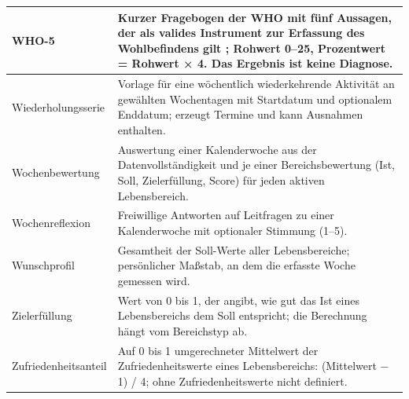 \begin{longtable}{@{}L{3.4cm}L{11.8cm}@{}}
  \midrule
  WHO-5 & Kurzer Fragebogen der \acs{WHO} mit fünf Aussagen, der als valides Instrument zur Erfassung des Wohlbefindens gilt \parencite[S.~167]{topp2015}; Rohwert 0--25, Prozentwert = Rohwert × 4. Das Ergebnis ist keine Diagnose. \\
  \midrule
  Wiederholungsserie & Vorlage für eine wöchentlich wiederkehrende Aktivität an gewählten Wochentagen mit Startdatum und optionalem Enddatum; erzeugt Termine und kann Ausnahmen enthalten. \\
  \midrule
  Wochenbewertung & Auswertung einer Kalenderwoche aus der Datenvollständigkeit und je einer Bereichsbewertung (Ist, Soll, Zielerfüllung, Score) für jeden aktiven Lebensbereich. \\
  \midrule
  Wochenreflexion & Freiwillige Antworten auf Leitfragen zu einer Kalenderwoche mit optionaler Stimmung (1--5). \\
  \midrule
  Wunschprofil & Gesamtheit der Soll-Werte aller Lebensbereiche; persönlicher Maßstab, an dem die erfasste Woche gemessen wird. \\
  \midrule
  Zielerfüllung & Wert von 0 bis 1, der angibt, wie gut das Ist eines Lebensbereichs dem Soll entspricht; die Berechnung hängt vom Bereichstyp ab. \\
  \midrule
  Zufriedenheitsanteil & Auf 0 bis 1 umgerechneter Mittelwert der Zufriedenheitswerte eines Lebensbereichs: (Mittelwert − 1) / 4; ohne Zufriedenheitswerte nicht definiert. \\
\end{longtable}
\endgroup
